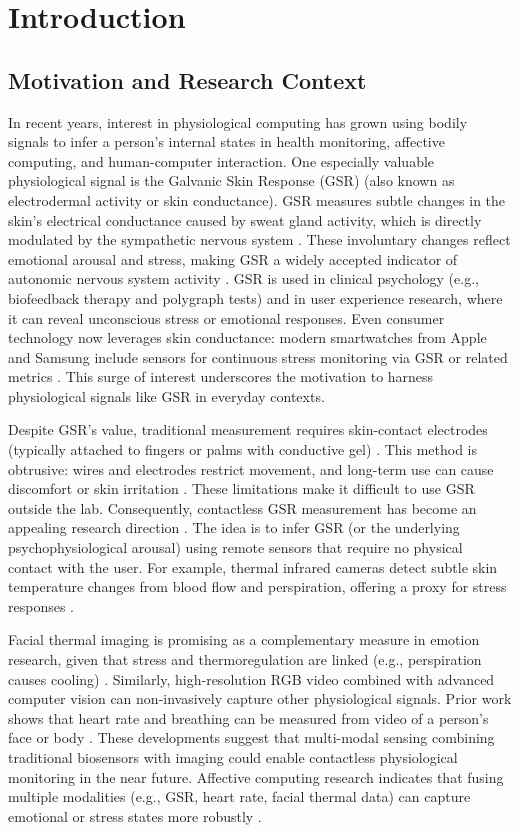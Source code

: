 \chapter{Introduction}


\section{Motivation and Research Context}
In recent years, interest in physiological computing has grown \textemdash using bodily signals to infer a person's internal states in health monitoring, affective computing, and human-computer interaction. One especially valuable physiological signal is the Galvanic Skin Response (GSR) (also known as electrodermal activity or skin conductance). GSR measures subtle changes in the skin's electrical conductance caused by sweat gland activity, which is directly modulated by the sympathetic nervous system \citep{ref1}. These involuntary changes reflect emotional arousal and stress, making GSR a widely accepted indicator of autonomic nervous system activity \citep{ref1}. GSR is used in clinical psychology (e.g., biofeedback therapy and polygraph tests) and in user experience research, where it can reveal unconscious stress or emotional responses. Even consumer technology now leverages skin conductance: modern smartwatches from Apple and Samsung include sensors for continuous stress monitoring via GSR or related metrics \citep{ref2}. This surge of interest underscores the motivation to harness physiological signals like GSR in everyday contexts.

Despite GSR's value, traditional measurement requires skin-contact electrodes (typically attached to fingers or palms with conductive gel) \citep{ref3}. This method is obtrusive: wires and electrodes restrict movement, and long-term use can cause discomfort or skin irritation \citep{ref3}. These limitations make it difficult to use GSR outside the lab. Consequently, contactless GSR measurement has become an appealing research direction \citep{ref4}. The idea is to infer GSR (or the underlying psychophysiological arousal) using remote sensors that require no physical contact with the user. For example, thermal infrared cameras detect subtle skin temperature changes from blood flow and perspiration, offering a proxy for stress responses \citep{ref5}.

Facial thermal imaging is promising as a complementary measure in emotion research, given that stress and thermoregulation are linked (e.g., perspiration causes cooling) \citep{ref5}. Similarly, high-resolution RGB video combined with advanced computer vision can non-invasively capture other physiological signals. Prior work shows that heart rate and breathing can be measured from video of a person's face or body \citep{ref6}. These developments suggest that multi-modal sensing \textemdash combining traditional biosensors with imaging \textemdash could enable contactless physiological monitoring in the near future. Affective computing research indicates that fusing multiple modalities (e.g., GSR, heart rate, facial thermal data) can capture emotional or stress states more robustly \citep{ref1}.

